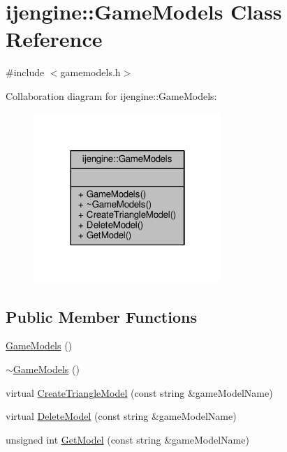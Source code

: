\hypertarget{classijengine_1_1GameModels}{\section{ijengine\-:\-:Game\-Models Class Reference}
\label{classijengine_1_1GameModels}
}


{\ttfamily \#include $<$gamemodels.\-h$>$}



Collaboration diagram for ijengine\-:\-:Game\-Models\-:\nopagebreak
\begin{figure}[H]
\begin{center}
\leavevmode
\includegraphics[width=202pt]{classijengine_1_1GameModels__coll__graph}
\end{center}
\end{figure}
\subsection*{Public Member Functions}
\begin{DoxyCompactItemize}
\item 
\hyperlink{classijengine_1_1GameModels_afe97cd039ac920bf467fe803fafd4808}{Game\-Models} ()
\item 
\hyperlink{classijengine_1_1GameModels_ab71ca79d237aa3ace876a1e0ee2250e5}{$\sim$\-Game\-Models} ()
\item 
virtual \hyperlink{classijengine_1_1GameModels_a23361e2d38ee8e35211e6298fd586ce2}{Create\-Triangle\-Model} (const string \&game\-Model\-Name)
\item 
virtual \hyperlink{classijengine_1_1GameModels_ae7a617bd2183603b61e0014aab9ff97a}{Delete\-Model} (const string \&game\-Model\-Name)
\item 
unsigned int \hyperlink{classijengine_1_1GameModels_ad517639f989d88b5cd36fc51319ec336}{Get\-Model} (const string \&game\-Model\-Name)
\end{DoxyCompactItemize}


